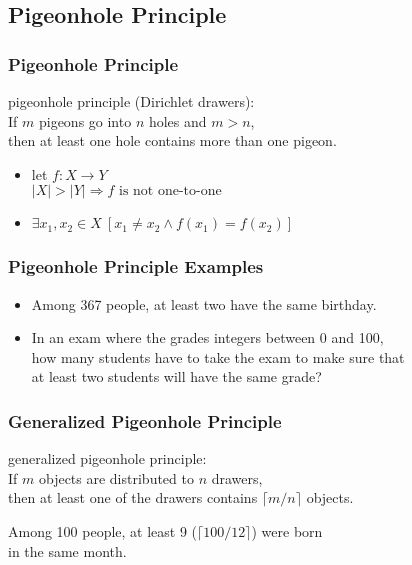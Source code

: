 \documentclass[dvipsnames]{beamer}
\begin{document}
\subsection{Pigeonhole Principle}

\begin{frame}
  \frametitle{Pigeonhole Principle}

  \begin{definition}
    \alert{pigeonhole principle} (Dirichlet drawers):\\
    If $m$ pigeons go into $n$ holes and $m>n$,\\
    then at least one hole contains more than one pigeon.
  \end{definition}

  \pause
  \begin{itemize}
    \item let $f: X \rightarrow Y$\\
      $|X|>|Y| \Rightarrow f \mbox{ is not one-to-one}$

    \item $\exists x_1,x_2 \in X~[x_1 \neq x_2 \wedge f(x_1)=f(x_2)]$
  \end{itemize}
\end{frame}

\begin{frame}
  \frametitle{Pigeonhole Principle Examples}

  \begin{example}
    \begin{itemize}
      \item Among 367 people, at least two have the same birthday.

      \pause
      \item In an exam where the grades integers between 0 and 100,\\
        how many students have to take the exam to make sure that\\
        at least two students will have the same grade?
    \end{itemize}
  \end{example}
\end{frame}

\begin{frame}
  \frametitle{Generalized Pigeonhole Principle}

  \begin{definition}
    \alert{generalized pigeonhole principle}:\\
    If $m$ objects are distributed to $n$ drawers,\\
    then at least one of the drawers contains $\lceil m / n \rceil$ objects.
  \end{definition}

  \pause
  \begin{example}
    Among 100 people, at least 9 ($\lceil 100 / 12 \rceil$) were born\\
    in the same month.
  \end{example}
\end{frame}
\end{document}
